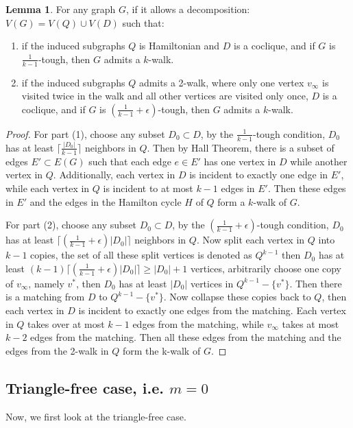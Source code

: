 \documentclass{amsart}
\theoremstyle{definition}
\newtheorem{lemma}{Lemma}
\begin{document}
\begin{lemma}\label{addtec}
For any graph $G$, if it allows a decomposition: $V(G)=V(Q)\cup V(D)$ such that:

\begin{enumerate} 
\item if the induced subgraphs $Q$ is Hamiltonian and $D$ is a coclique, and if $G$ is $\frac{1}{k-1}$-tough, then $G$ admits a $k$-walk.
\item if the induced subgraphs $Q$ admits a 2-walk, where only one vertex $v_{\infty}$ is visited twice in the walk and all other vertices are visited only once, $D$ is a coclique, and if $G$ is $(\frac{1}{k-1}+\epsilon)$-tough, then $G$ admits a $k$-walk.

\end{enumerate}
\end{lemma}

\begin{proof}
For part (1), choose any subset $D_0\subset D$, by the $\frac{1}{k-1}$-tough condition, $D_0$ has at least $\lceil\frac{|D_0|}{k-1}\rceil$ neighbors in $Q$. Then by Hall Theorem, there is a subset of edges $E'\subset E(G)$ such that each edge $e\in E'$ has one vertex in $D$ while another vertex in $Q$. Additionally, each vertex in $D$ is incident to exactly one edge in $E'$, while each vertex in $Q$ is incident to at most $k-1$ edges in $E'$.
Then these edges in $E'$ and the edges in the Hamilton cycle $H$ of $Q$ form a $k$-walk of $G$.

For part (2), choose any subset $D_0\subset D$, by the $(\frac{1}{k-1}+\epsilon)$-tough condition, $D_0$ has at least $\lceil(\frac{1}{k-1}+\epsilon)|D_0|\rceil$ neighbors in $Q$. Now split each vertex in $Q$ into $k-1$ copies, the set of all these split vertices is denoted as $Q^{k-1}$ then $D_0$ has at least $(k-1)\lceil(\frac{1}{k-1}+\epsilon)|D_0|\rceil\ge|D_0|+1$ vertices, arbitrarily choose one copy of $v_{\infty}$, namely $v^*$, then $D_0$ has at least $|D_0|$ vertices in $Q^{k-1}-\{v^*\}$. Then there is a matching from $D$ to $Q^{k-1}-\{v^*\}$. Now collapse these copies back to $Q$, then each vertex in $D$ is incident to exactly one edges from the matching. Each vertex in $Q$ takes over at most $k-1$ edges from the matching, while $v_{\infty}$ takes at most $k-2$ edges from the matching. Then all these edges from the matching and the edges from the 2-walk in $Q$ form the k-walk of $G$.
\end{proof}


\subsection{Triangle-free case, i.e. $m=0$}
Now, we first look at the triangle-free case.
\end{document}
